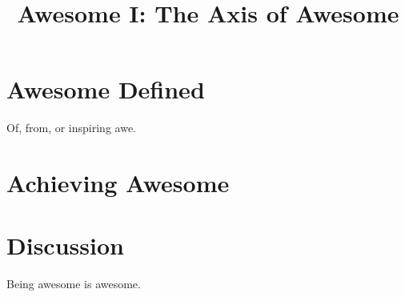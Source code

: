 \documentclass{article}
\begin{document}
\title{Awesome I: The Axis of Awesome}

\section{Awesome Defined}

Of, from, or inspiring awe.

\section{Achieving Awesome}


\section{Discussion}

Being awesome is awesome.
\end{document}
